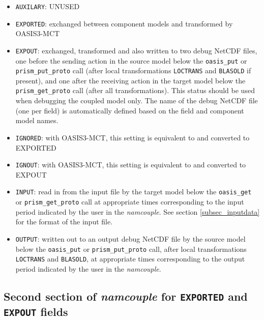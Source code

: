 \begin{itemize}
\item {\tt AUXILARY}: UNUSED
\item {\tt EXPORTED}: exchanged between component models and
  transformed by OASIS3-MCT
\item {\tt EXPOUT}: exchanged, transformed and also written to two
  debug NetCDF files, one before the sending action in the source model
  below the {\tt oasis\_put} or {\tt prism\_put\_proto} call (after local transformations {\tt LOCTRANS} and {\tt BLASOLD} if present), and one after the receiving
  action in the target model below the {\tt prism\_get\_proto} call (after all transformations). This status should
  be used when debugging the coupled model only. The name of the debug NetCDF file (one per field) is
  automatically defined based on the field and component model names.
\item {\tt IGNORED}: with OASIS3-MCT, this setting is equivalent to and converted to EXPORTED
\item {\tt IGNOUT}: with OASIS3-MCT, this setting is equivalent to and converted to EXPOUT
\item {\tt INPUT}: read in from the input file by the target
  model below the {\tt oasis\_get} or {\tt prism\_get\_proto} call at appropriate
  times corresponding to the input period indicated by the user in the
  {\it namcouple}. See section
  \ref{subsec_inputdata} for the format of the input file.
\item {\tt OUTPUT}: written out to an output debug NetCDF file by the source
  model below the {\tt oasis\_put} or {\tt prism\_put\_proto} call, after local transformations {\tt LOCTRANS} and {\tt BLASOLD}, at appropriate
  times corresponding to the output period indicated by the user in
  the {\it namcouple}. 

\end{itemize}

\subsection{Second section of {\it namcouple} for {\tt EXPORTED} and {\tt EXPOUT} fields}
\label{subsubsec_secondEXPORTED}

